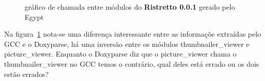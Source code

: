 \begin{figure}
{}
\caption{gráfico de chamada entre módulos do {\bf Ristretto 0.0.1} gerado pelo Egypt}
\label{ristretto-0.0.1}
\end{figure}

Na figura~\ref{ristretto-0.0.1} nota-se uma diferença interessante entre as
informaçõe extraídas pelo GCC e o Doxyparse, há uma inversão entre os módulos
thumbnailer\_viewer e picture\_viewer. Enquanto o Doxyparse diz que o
picture\_viewer chama o thumbnailer\_viewer no GCC temos o contrário, qual
deles está errado ou os dois estão errados?

\begin{figure}
\center
{}
\qquad
{}
\end{figure}

